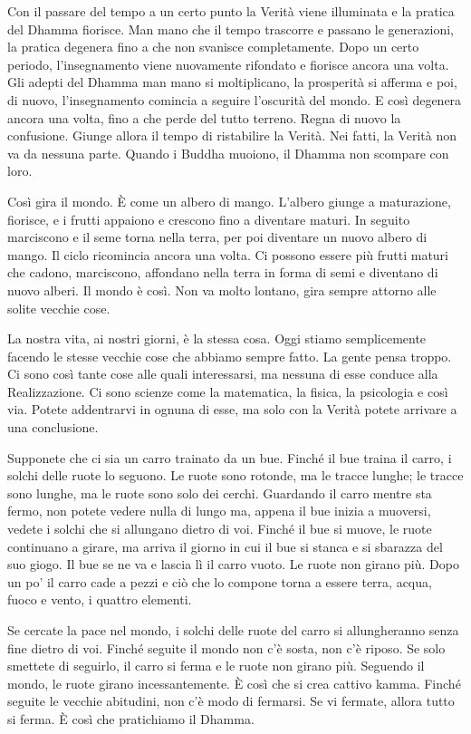 Con il passare del tempo a un certo punto la Verità viene illuminata e
la pratica del Dhamma fiorisce. Man mano che il tempo trascorre e
passano le generazioni, la pratica degenera fino a che non svanisce
completamente. Dopo un certo periodo, l'insegnamento viene nuovamente
rifondato e fiorisce ancora una volta. Gli adepti del Dhamma man mano si
moltiplicano, la prosperità si afferma e poi, di nuovo, l'insegnamento
comincia a seguire l'oscurità del mondo. E così degenera ancora una
volta, fino a che perde del tutto terreno. Regna di nuovo la confusione.
Giunge allora il tempo di ristabilire la Verità. Nei fatti, la Verità
non va da nessuna parte. Quando i Buddha muoiono, il Dhamma non scompare
con loro.

Così gira il mondo. È come un albero di mango. L'albero giunge a
maturazione, fiorisce, e i frutti appaiono e crescono fino a diventare
maturi. In seguito marciscono e il seme torna nella terra, per poi
diventare un nuovo albero di mango. Il ciclo ricomincia ancora una
volta. Ci possono essere più frutti maturi che cadono, marciscono,
affondano nella terra in forma di semi e diventano di nuovo alberi. Il
mondo è così. Non va molto lontano, gira sempre attorno alle solite
vecchie cose.

La nostra vita, ai nostri giorni, è la stessa cosa. Oggi stiamo
semplicemente facendo le stesse vecchie cose che abbiamo sempre fatto.
La gente pensa troppo. Ci sono così tante cose alle quali interessarsi,
ma nessuna di esse conduce alla Realizzazione. Ci sono scienze come la
matematica, la fisica, la psicologia e così via. Potete addentrarvi in
ognuna di esse, ma solo con la Verità potete arrivare a una conclusione.

Supponete che ci sia un carro trainato da un bue. Finché il bue traina
il carro, i solchi delle ruote lo seguono. Le ruote sono rotonde, ma le
tracce lunghe; le tracce sono lunghe, ma le ruote sono solo dei cerchi.
Guardando il carro mentre sta fermo, non potete vedere nulla di lungo
ma, appena il bue inizia a muoversi, vedete i solchi che si allungano
dietro di voi. Finché il bue si muove, le ruote continuano a girare, ma
arriva il giorno in cui il bue si stanca e si sbarazza del suo giogo. Il
bue se ne va e lascia lì il carro vuoto. Le ruote non girano più. Dopo
un po' il carro cade a pezzi e ciò che lo compone torna a essere terra,
acqua, fuoco e vento, i quattro elementi.

Se cercate la pace nel mondo, i solchi delle ruote del carro si
allungheranno senza fine dietro di voi. Finché seguite il mondo non c'è
sosta, non c'è riposo. Se solo smettete di seguirlo, il carro si ferma e
le ruote non girano più. Seguendo il mondo, le ruote girano
incessantemente. È così che si crea cattivo kamma. Finché seguite
le vecchie abitudini, non c'è modo di fermarsi. Se vi fermate, allora
tutto si ferma. È così che pratichiamo il Dhamma.

